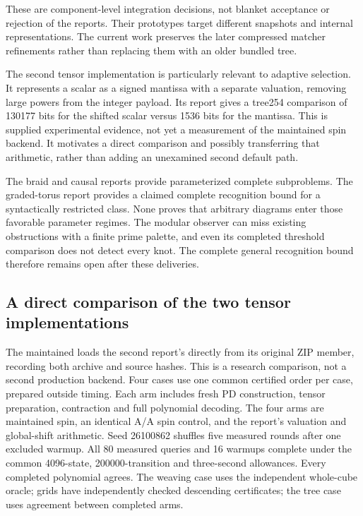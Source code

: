 These are component-level integration decisions, not blanket acceptance or
rejection of the reports. Their prototypes target different snapshots and
internal representations. The current work preserves the later compressed
matcher refinements rather than replacing them with an older bundled tree.

The second tensor implementation is particularly relevant to adaptive
selection. It represents a scalar as a signed mantissa with a separate
valuation, removing large powers from the integer payload. Its report gives
a tree254 comparison of 130177 bits for the shifted scalar versus 1536 bits
for the mantissa. This is supplied experimental evidence, not yet a
measurement of the maintained spin backend. It motivates a direct comparison
and possibly transferring that arithmetic, rather than adding an unexamined
second default path.

The braid and causal reports provide parameterized complete subproblems.
The graded-torus report provides a claimed complete recognition bound for a
syntactically restricted class. None proves that arbitrary diagrams enter
those favorable parameter regimes. The modular observer can miss existing
obstructions with a finite prime palette, and even its completed threshold
comparison does not detect every knot. The complete general recognition
bound therefore remains open after these deliveries.

\subsection{A direct comparison of the two tensor implementations}
The maintained  loads the second report's
 directly from its original ZIP member, recording both
archive and source hashes. This is a research comparison, not a second
production backend. Four cases use one common certified order per case,
prepared outside timing. Each arm includes fresh PD construction, tensor
preparation, contraction and full polynomial decoding. The four arms are
maintained spin, an identical A/A spin control, and the report's valuation
and global-shift arithmetic. Seed 26100862 shuffles five measured rounds
after one excluded warmup. All 80 measured queries and 16 warmups complete
under the common 4096-state, 200000-transition and three-second allowances.
Every completed polynomial agrees. The weaving case uses the independent
whole-cube oracle; grids have independently checked descending certificates;
the tree case uses agreement between completed arms.

